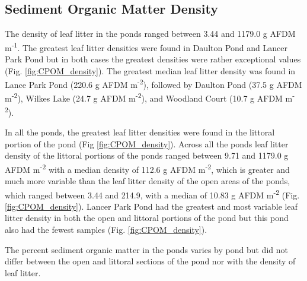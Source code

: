 \subsection{Sediment Organic Matter Density}

The density of leaf litter in the ponds ranged between 3.44 and 1179.0 g AFDM m\textsuperscript{-1}. The greatest leaf litter densities were found in Daulton Pond and Lancer Park Pond but in both cases the greatest densities were rather exceptional values (Fig. \ref{fig:CPOM_density}). The greatest median leaf litter density was found in Lance Park Pond (220.6 g AFDM m\textsuperscript{-2}), followed by Daulton Pond (37.5 g AFDM m\textsuperscript{-2}), Wilkes Lake (24.7 g AFDM m\textsuperscript{-2}), and Woodland Court (10.7 g AFDM m\textsuperscript{-2}). 

In all the ponds, the greatest leaf litter densities were found in the littoral portion of the pond (Fig \ref{fig:CPOM_density}). Across all the ponds leaf litter density of the littoral portions of the ponds ranged between 9.71 and 1179.0 g AFDM m\textsuperscript{-2} with a median density of 112.6 g AFDM m\textsuperscript{-2}, which is greater and much more variable than the leaf litter density of the open areas of the ponds, which ranged between 3.44 and 214.9, with a median of 10.83 g AFDM m\textsuperscript{-2} (Fig. \ref{fig:CPOM_density}). Lancer Park Pond had the greatest and most variable leaf litter density in both the open and littoral portions of the pond but this pond also had the fewest samples (Fig. \ref{fig:CPOM_density}). 

The percent sediment organic matter in the ponds varies by pond but did not differ between the open and littoral sections of the pond nor with the density of leaf litter.

  

  
